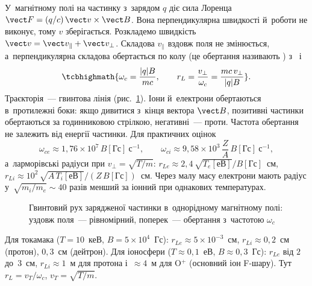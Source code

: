 У~магнітному полі на частинку з~зарядом $q$ діє сила Лоренца $\vect F=(q/c)\,\vect
v\times\vect B$. Вона перпендикулярна швидкості й~роботи не виконує, тому $v$
зберігається. Розкладемо швидкість $\vect v=\vect v_\parallel+\vect v_\perp$. Складова
$v_\parallel$ вздовж поля не змінюється, а~перпендикулярна складова обертається по колу (це обертання називають )
з~ і~
\begin{equation}\label{eq:larmor}
	\tcbhighmath{\omega_c=\frac{|q|B}{mc},\qquad r_L=\frac{v_\perp}{\omega_c}=\frac{mc\,v_\perp}{|q|B}}.
\end{equation}
Траєкторія~--- гвинтова лінія (рис.~\ref{pic:larmor-motion}). Іони й~електрони обертаються
в~протилежні боки: якщо дивитися з~кінця вектора $\vect B$, позитивні частинки обертаються
за годинниковою стрілкою, негативні~--- проти. Частота обертання не залежить від енергії
частинки. Для практичних оцінок
\begin{equation*}
	\omega_{ce}\approx1{,}76\times10^{7}\,B[\text{Гс}]~\mathrm{с}^{-1},\qquad
	\omega_{ci}\approx9{,}58\times10^{3}\,\frac ZA\,B[\text{Гс}]~\mathrm{с}^{-1},
\end{equation*}
а~ларморівські радіуси при $v_\perp=\sqrt{T/m}$:
$r_{Le}\approx2{,}4\,\sqrt{T_e[\text{еВ}]}/B[\text{Гс}]$~см,
$r_{Li}\approx10^2\,\sqrt{A\,T_i[\text{еВ}]}/(Z\,B[\text{Гс}])$~см. Через малу масу
електрони мають радіус у~$\sqrt{m_i/m_e}\sim40$ разів менший за іонний при однакових
температурах.

\begin{figure}[h!]\centering
	\caption{Гвинтовий рух зарядженої частинки в~однорідному магнітному полі: уздовж
	поля~--- рівномірний, поперек~--- обертання з~частотою $\omega_c$}
	\label{pic:larmor-motion}
\end{figure}

\begin{Estimate}
Для токамака ($T=10$~кеВ, $B=5\times10^4$~Гс): $r_{Le}\approx5\times10^{-3}$~см, $r_{Li}\approx0{,}2$~см (протон), $0{,}3$~см (дейтрон).
Для іоносфери ($T\approx0{,}1$~еВ, $B\approx0{,}3$~Гс): $r_{Le}$ від $2$ до~$3$~см, $r_{Li}\approx1$~м для протона і~$\approx4$~м для O$^+$ (основний іон F-шару).
Тут $r_L=v_T/\omega_c$, $v_T=\sqrt{T/m}$.
\end{Estimate}

